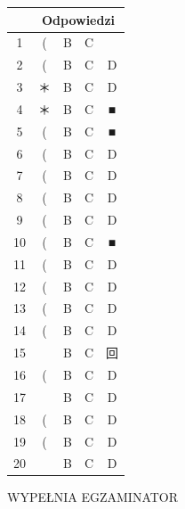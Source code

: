 \documentclass[10pt]{article}
\begin{document}
\begin{center}
\begin{tabular}{|c|c|c|c|c|}
\hline
 & \multicolumn{4}{|c|}{Odpowiedzi} \\
\hline
1 & ( & B & C &  \\
\hline
2 & ( & B & C & D \\
\hline
3 & ＊ & B & C & D \\
\hline
4 & ＊ & B & C & ■ \\
\hline
5 & ( & B & C & ■ \\
\hline
6 & ( & B & C & D \\
\hline
7 & ( & B & C & D \\
\hline
8 & ( & B & C & D \\
\hline
9 & ( & B & C & D \\
\hline
10 & ( & B & C & ■ \\
\hline
11 & ( & B & C & D \\
\hline
12 & ( & B & C & D \\
\hline
13 & ( & B & C & D \\
\hline
14 & ( & B & C & D \\
\hline
15 &  & B & C & 回 \\
\hline
16 & ( & B & C & D \\
\hline
17 &  & B & C & D \\
\hline
18 & ( & B & C & D \\
\hline
19 & ( & B & C & D \\
\hline
20 &  & B & C & D \\
\hline
\end{tabular}
\end{center}

WYPEŁNIA EGZAMINATOR
\end{document}
